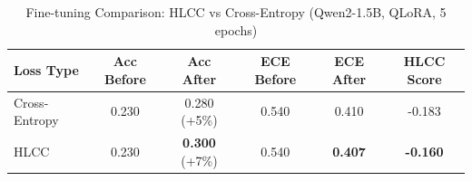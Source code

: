 \begin{table}[h]
\centering
\caption{Fine-tuning Comparison: HLCC vs Cross-Entropy (Qwen2-1.5B, QLoRA, 5 epochs)}
\begin{tabular}{lccccc}
\toprule
Loss Type & Acc Before & Acc After & ECE Before & ECE After & HLCC Score \\
\midrule
Cross-Entropy & 0.230 & 0.280 (+5\%) & 0.540 & 0.410 & -0.183 \\
HLCC & 0.230 & \textbf{0.300} (+7\%) & 0.540 & \textbf{0.407} & \textbf{-0.160} \\
\bottomrule
\end{tabular}
\label{tab:finetuning_comparison}
\end{table}

